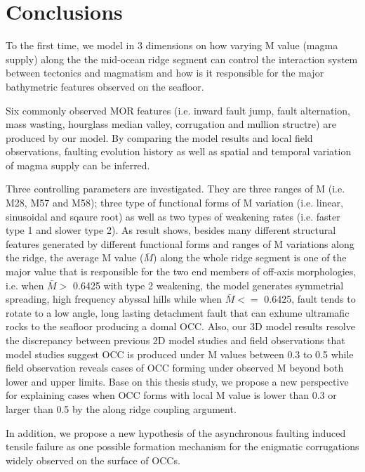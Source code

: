 \pagebreak
\section{Conclusions}
To the first time, we model in 3 dimensions on how varying M value (magma supply) along the the mid-ocean ridge segment can control the interaction system between tectonics and magmatism and how is it responsible for the major bathymetric features observed on the seafloor.

Six commonly observed MOR features (i.e. inward fault jump, fault alternation, mass wasting, hourglass median valley, corrugation and mullion structre) are produced by our model. By comparing the model results and local field observations, faulting evolution history as well as spatial and temporal variation of magma supply can be inferred.

Three controlling parameters are investigated. They are three ranges of M (i.e. M28, M57 and M58); three type of functional forms of M variation (i.e. linear, sinusoidal and sqaure root) as well as two types of weakening rates (i.e. faster type 1 and slower type 2). As result shows, besides many different structural features generated by different functional forms and ranges of M variations along the ridge, the average M value ($\bar{M}$) along the whole ridge segment is one of the major value that is responsible for the two end members of off-axis morphologies, i.e. when $\bar{M} >$ 0.6425 with type 2 weakening, the model generates symmetrial spreading, high frequency abyssal hills while when $\bar{M} <=$ 0.6425, fault tends to rotate to a low angle, long lasting detachment fault that can exhume ultramafic rocks to the seafloor producing a domal OCC. Also, our 3D model results resolve the discrepancy between previous 2D model studies and field observations that model studies suggest OCC is produced under M values between 0.3 to 0.5 while field observation reveals cases of OCC forming under observed M beyond both lower and upper limits. Base on this thesis study, we propose a new perspective for explaining cases when OCC forms with local M value is lower than 0.3 or larger than 0.5 by the along ridge coupling argument.

In addition, we propose a new hypothesis of the asynchronous faulting induced tensile failure as one possible formation mechanism for the enigmatic corrugations widely observed on the surface of OCCs.




